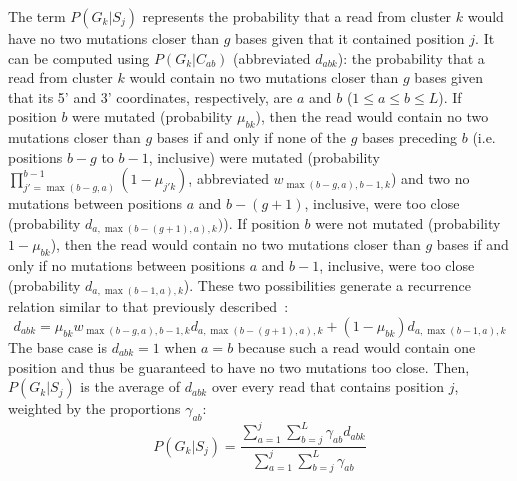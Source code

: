 \documentclass[main.tex]{subfiles}
\begin{document}
The term $P(G_k | S_j)$ represents the probability that a read from cluster $k$ would have no two mutations closer than $g$ bases given that it contained position $j$.
It can be computed using $P(G_k | C_{ab})$ (abbreviated $d_{abk}$): the probability that a read from cluster $k$ would contain no two mutations closer than $g$ bases given that its 5' and 3' coordinates, respectively, are $a$ and $b$ ($1 \le a \le b \le L$).
If position $b$ were mutated (probability $\mu_{bk}$), then the read would contain no two mutations closer than $g$ bases if and only if none of the $g$ bases preceding $b$ (i.e. positions $b - g$ to $b - 1$, inclusive) were mutated (probability $\prod_{j'=\max(b-g, a)}^{b-1}(1 - \mu_{j'k})$, abbreviated $w_{\max(b-g, a),b-1,k}$) and two no mutations between positions $a$ and $b - (g + 1)$, inclusive, were too close (probability $d_{a,\max(b-(g+1), a),k})$).
If position $b$ were not mutated (probability $1 - \mu_{bk}$), then the read would contain no two mutations closer than $g$ bases if and only if no mutations between positions $a$ and $b - 1$, inclusive, were too close (probability $d_{a,\max(b-1,a),k}$).
These two possibilities generate a recurrence relation similar to that previously described~\cite{Tomezsko2020}:
$$d_{abk} = \mu_{bk} w_{\max(b-g, a),b-1,k} d_{a,\max(b-(g+1), a),k} + (1 - \mu_{bk}) d_{a,\max(b-1,a),k}$$
The base case is $d_{abk} = 1$ when $a = b$ because such a read would contain one position and thus be guaranteed to have no two mutations too close.
Then, $P(G_k | S_j)$ is the average of $d_{abk}$ over every read that contains position $j$, weighted by the proportions $\gamma_{ab}$:
$$P(G_k | S_j) = \frac{\sum_{a=1}^{j}\sum_{b=j}^{L}\gamma_{ab}d_{abk}}{\sum_{a=1}^{j}\sum_{b=j}^{L}\gamma_{ab}}$$
\end{document}
